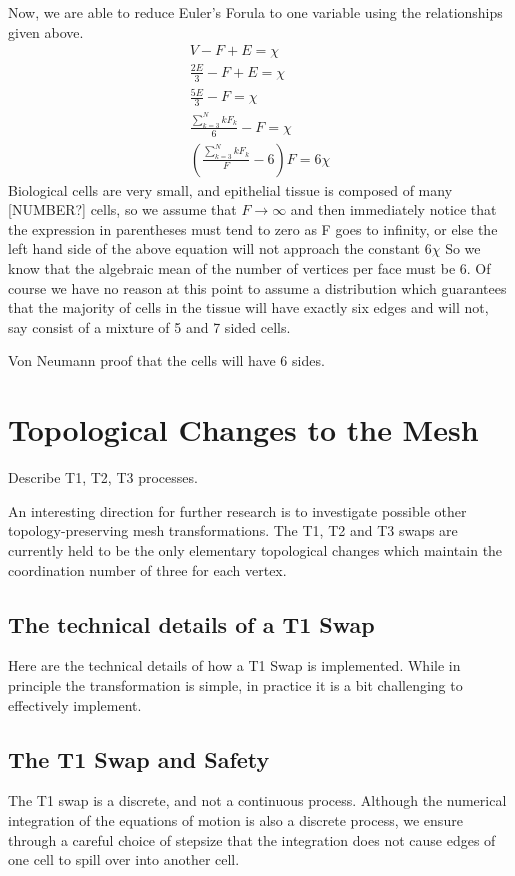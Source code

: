 Now, we are able to reduce Euler's Forula to one variable using the relationships given above.
\begin{gather}
V - F + E = \chi\\
\frac{2E}3 - F + E = \chi\\
\frac{5E}3 - F = \chi\\
\frac{\sum_{k=3}^N kF_k}{6} - F = \chi\\
(\frac{\sum_{k=3}^N kF_k}{F} - 6)F = 6\chi
\end{gather}
Biological cells are very small, and epithelial tissue is composed of many [NUMBER?] cells, so we assume that $F\to\infty$ and then immediately notice that the expression in parentheses must tend to zero as F goes to infinity, or else the left hand side of the above equation will not approach the constant $6\chi$
So we know that the algebraic mean of the number of vertices per face must be 6. Of course we have no reason at this point to assume a distribution which guarantees that the majority of cells in the tissue will have exactly six edges and will not, say consist of a mixture of 5 and 7 sided cells.

Von Neumann proof that the cells will have 6 sides.

\section{Topological Changes to the Mesh}
Describe T1, T2, T3 processes.

An interesting direction for further research is to investigate possible other topology-preserving mesh transformations. The T1, T2 and T3 swaps are currently held to be the only elementary topological changes which maintain the coordination number of three for each vertex.

\subsection{The technical details of a T1 Swap}
Here are the technical details of how a T1 Swap is implemented. While in principle the transformation is simple, in practice it is a bit challenging to effectively implement. 


\subsection{The T1 Swap and Safety}
The T1 swap is a discrete, and not a continuous process. Although the numerical integration of the equations of motion is also a discrete process, we ensure through a careful choice of stepsize that the integration does not cause edges of one cell to spill over into another cell.

